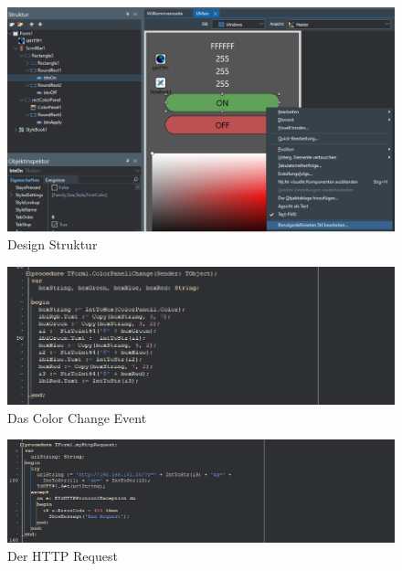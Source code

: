 \begin{figure}[h]
\begin{center}
\includegraphics[width=15cm]{img/designstrucktur.png}
\caption{Design Struktur}
\label{designstruktur}
\end{center}
\end{figure}

\begin{figure}[h]
\begin{center}
\includegraphics[width=15cm]{img/colorchange.png}
\caption{Das Color Change Event}
\label{colorchange}
\end{center}
\end{figure}

\begin{figure}[h]
\begin{center}
\includegraphics[width=15cm]{img/httprequest.png}
\caption{Der HTTP Request}
\label{httprequest}
\end{center}
\end{figure}

